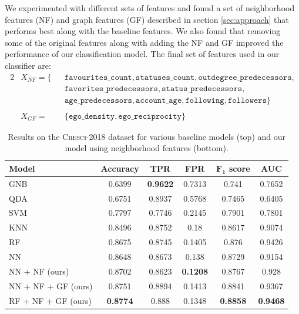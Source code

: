 We experimented with different sets of features and found a set of neighborhood features (NF) and graph features (GF) described in section \ref{sec:approach} that performs best along with the baseline features. We also found that removing some of the original features along with adding the  NF and GF improved the performance of our classification model. The final set of features used in our classifier are:
\begin{alignat*}{2}
    & X_{NF} = \{ && \texttt{favourites\_count}, \texttt{statuses\_count}, \texttt{outdegree\_predecessors}, \\
    & && \texttt{favorites\_predecessors}, \texttt{status\_predecessors}, \\
    & && \texttt{age\_predecessors}, \texttt{account\_age}, \texttt{following}, \texttt{followers} \} \\
    \\
    & X_{GF} = && \{ \texttt{ego\_density}, \texttt{ego\_reciprocity} \}
\end{alignat*}

\begin{table}[t]
\centering
\setlength{\tabcolsep}{12pt}
\begin{tabular}{@{}lccccc@{}}
\toprule
\textbf{Model} & \textbf{Accuracy} & \textbf{TPR} & \textbf{FPR} & \textbf{$\boldsymbol{F_1}$ score} & \textbf{AUC} \\ \midrule
GNB             & 0.6399 & \textbf{0.9622} & 0.7313 & 0.741  & 0.7652 \\
QDA             & 0.6751 & 0.8937 & 0.5768 & 0.7465 & 0.6405 \\
SVM             & 0.7797 & 0.7746 & 0.2145 & 0.7901 & 0.7801 \\
KNN             & 0.8496 & 0.8752 & 0.18   & 0.8617 & 0.9074 \\
RF              & 0.8675 & 0.8745 & 0.1405 & 0.876  & 0.9426 \\
NN              & 0.8648 & 0.8673 & 0.138  & 0.8729 & 0.9154 \\ \midrule
NN + NF (ours)  & 0.8702 & 0.8623 & \textbf{0.1208} & 0.8767 & 0.928 \\
NN + NF + GF (ours) & 0.8751 & 0.8894 & 0.1413 & 0.8841 & 0.9367 \\
RF + NF + GF (ours) & \textbf{0.8774} & 0.888 & 0.1348 & \textbf{0.8858} & \textbf{0.9468} \\
\bottomrule
\end{tabular}
\caption{Results on the \textsc{Cresci-2018} dataset for various baseline models (top) and our model using neighborhood features (bottom).}
\label{tab:results}
\end{table}

